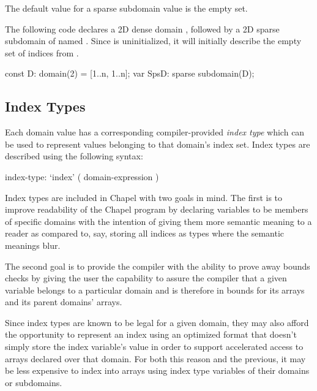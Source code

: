 The default value for a sparse subdomain value is the empty set.

\begin{example}
The following code declares a 2D dense domain , followed by a
2D sparse subdomain of  named .  Since 
is uninitialized, it will initially describe the empty set of indices
from .
\begin{chapel}
const D: domain(2) = [1..n, 1..n];
var SpsD: sparse subdomain(D);
\end{chapel}
\end{example}



\subsection{Index Types}
\label{Index_Types}

Each domain value has a corresponding compiler-provided \emph{index
type} which can be used to represent values belonging to that domain's
index set.  Index types are described using the following syntax:

\begin{syntax}
index-type:
  `index' ( domain-expression )
\end{syntax}

\begin{rationale}

Index types are included in Chapel with two goals in mind. The first
is to improve readability of the Chapel program by declaring variables
to be members of specific domains with the intention of giving them
more semantic meaning to a reader as compared to, say, storing all
indices as  types where the semantic meanings blur.

The second goal is to provide the compiler with the ability to prove
away bounds checks by giving the user the capability to assure the
compiler that a given variable belongs to a particular domain and is
therefore in bounds for its arrays and its parent domains' arrays.

Since index types are known to be legal for a given domain, they may
also afford the opportunity to represent an index using an optimized
format that doesn't simply store the index variable's value in order
to support accelerated access to arrays declared over that domain.
For both this reason and the previous, it may be less expensive to
index into arrays using index type variables of their domains or
subdomains.

\end{rationale}

